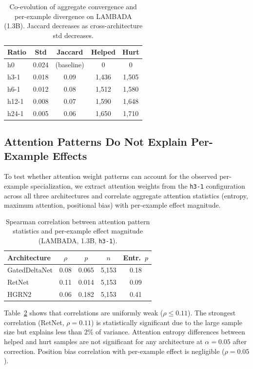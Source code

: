 \documentclass[11pt,a4paper]{article}
\begin{document}
\begin{table}[t]
\centering
\caption{Co-evolution of aggregate convergence and per-example divergence on LAMBADA (1.3B). Jaccard decreases as cross-architecture std decreases.}
\label{tab:coevolution}
\small
\begin{tabular}{lcccc}
\toprule
\textbf{Ratio} & \textbf{Std} & \textbf{Jaccard} & \textbf{Helped} & \textbf{Hurt} \\
\midrule
h0 & 0.024 & (baseline) & 0 & 0 \\
h3-1 & 0.018 & 0.09 & 1,436 & 1,505 \\
h6-1 & 0.012 & 0.08 & 1,512 & 1,580 \\
h12-1 & 0.008 & 0.07 & 1,590 & 1,648 \\
h24-1 & 0.005 & 0.06 & 1,650 & 1,710 \\
\bottomrule
\end{tabular}
\end{table}

\subsection{Attention Patterns Do Not Explain Per-Example Effects}
\label{sec:attention_analysis}

To test whether attention weight patterns can account for the observed per-example specialization, we extract attention weights from the \texttt{h3-1} configuration across all three architectures and correlate aggregate attention statistics (entropy, maximum attention, positional bias) with per-example effect magnitude.

\begin{table}[t]
\centering
\caption{Spearman correlation between attention pattern statistics and per-example effect magnitude (LAMBADA, 1.3B, \texttt{h3-1}).}
\label{tab:attn_corr}
\small
\begin{tabular}{lcccc}
\toprule
\textbf{Architecture} & $\rho$ & $p$ & $n$ & \textbf{Entr.\ $p$} \\
\midrule
GatedDeltaNet & 0.08 & 0.065 & 5,153 & 0.18 \\
RetNet & 0.11 & 0.014 & 5,153 & 0.09 \\
HGRN2 & 0.06 & 0.182 & 5,153 & 0.41 \\
\bottomrule
\end{tabular}
\end{table}

Table~\ref{tab:attn_corr} shows that correlations are uniformly weak ($\rho \leq 0.11$). The strongest correlation (RetNet, $\rho = 0.11$) is statistically significant due to the large sample size but explains less than 2\% of variance. Attention entropy differences between helped and hurt samples are not significant for any architecture at $\alpha = 0.05$ after correction. Position bias correlation with per-example effect is negligible ($\rho = 0.05$).
\end{document}
